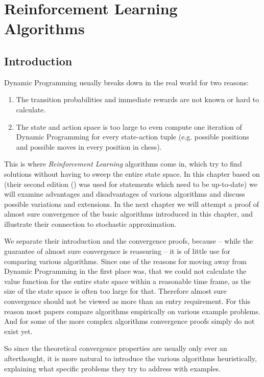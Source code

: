 
\chapter{Reinforcement Learning Algorithms}

\section{Introduction}

Dynamic Programming usually breaks down in the real world for two reasons:
\begin{enumerate}
    \item The transition probabilities and immediate rewards are not known or hard to calculate.
    \item The state and action space is too large to even compute one iteration of Dynamic Programming for every state-action tuple (e.g. possible positions and possible moves in every position in chess).
\end{enumerate}

This is where \emph{Reinforcement Learning} algorithms come in, which try to find solutions without having to sweep the entire state space. In this chapter based on \textcite{suttonReinforcementLearningIntroduction1998} (their second edition (\citeyear{suttonReinforcementLearningIntroduction2018a}) was used for statements which need to be up-to-date) we will examine advantages and disadvantages of various algorithms and discuss possible variations and extensions. In the next chapter we will attempt a proof of almost sure convergence of the basic algorithms introduced in this chapter, and illustrate their connection to stochastic approximation.

We separate their introduction and the convergence proofs, because -- while the guarantee of almost sure convergence is reassuring -- it is of little use for comparing various algorithms. Since one of the reasons for moving away from Dynamic Programming in the first place was, that we could not calculate the value function for the entire state space within a reasonable time frame, as the size of the state space is often too large for that. Therefore almost sure convergence should not be viewed as more than an entry requirement. For this reason most papers compare algorithms empirically on various example problems. And for some of the more complex algorithms convergence proofs simply do not exist yet. 

So since the theoretical convergence properties are usually only ever an afterthought, it is more natural to introduce the various algorithms heuristically, explaining what specific problems they try to address with examples.

